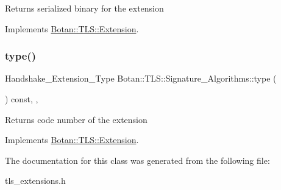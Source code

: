 \begin{DoxyReturn}{Returns}
serialized binary for the extension 
\end{DoxyReturn}


Implements \hyperlink{class_botan_1_1_t_l_s_1_1_extension_a56788726ad2526db54e5a26039cb69db}{Botan\+::\+T\+L\+S\+::\+Extension}.

\mbox{\label{class_botan_1_1_t_l_s_1_1_signature___algorithms_a9a316f000ee5c6eb181e6109bbc40b55}} 
\subsubsection{\texorpdfstring{type()}{type()}}
{\footnotesize\ttfamily Handshake\+\_\+\+Extension\+\_\+\+Type Botan\+::\+T\+L\+S\+::\+Signature\+\_\+\+Algorithms\+::type (\begin{DoxyParamCaption}{ }\end{DoxyParamCaption}) const\hspace{0.3cm}{\ttfamily [inline]}, {\ttfamily [override]}, {\ttfamily [virtual]}}

\begin{DoxyReturn}{Returns}
code number of the extension 
\end{DoxyReturn}


Implements \hyperlink{class_botan_1_1_t_l_s_1_1_extension_ac8819b312ce604453225e7b4f7c373ec}{Botan\+::\+T\+L\+S\+::\+Extension}.



The documentation for this class was generated from the following file\+:\begin{DoxyCompactItemize}
\item 
tls\+\_\+extensions.\+h\end{DoxyCompactItemize}
